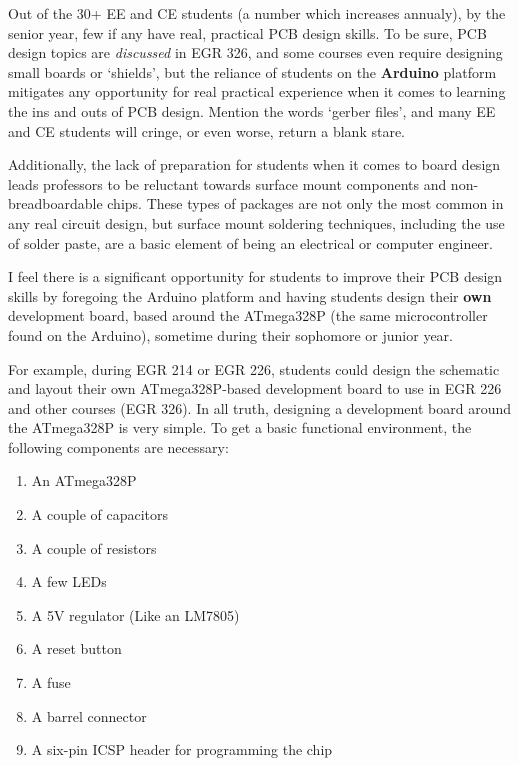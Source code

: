 \documentclass[12pt]{article}
\numberwithin{figure}{section}
\numberwithin{equation}{section}
\begin{document}
{\bigskip

Out of the 30+ EE and CE students (a number which increases annualy), by
the senior year, few if any have real, practical PCB design skills. To
be sure, PCB design topics are \emph{discussed} in EGR 326, and some
courses even require designing small boards or `shields', but the
reliance of students on the \textbf{Arduino} platform mitigates any
opportunity for real practical experience when it comes to learning the
ins and outs of PCB design. Mention the words `gerber files', and many
EE and CE students will cringe, or even worse, return a blank stare.

\bigskip

Additionally, the lack of preparation for students when it comes to
board design leads professors to be reluctant towards surface mount
components and non-breadboardable chips. These types of packages are not
only the most common in any real circuit design, but surface mount
soldering techniques, including the use of solder paste, are a basic
element of being an electrical or computer engineer.

\bigskip

I feel there is a significant opportunity for students to improve their
PCB design skills by foregoing the Arduino platform and having students
design their \textbf{own} development board, based around the ATmega328P
(the same microcontroller found on the Arduino), sometime during their
sophomore or junior year.

\bigskip

For example, during EGR 214 or EGR 226, students could design the
schematic and layout their own ATmega328P-based development board to use
in EGR 226 and other courses (EGR 326). In all truth, designing a
development board around the ATmega328P is very simple. To get a basic
functional environment, the following components are necessary:

\begin{enumerate}
\itemsep1pt\parskip0pt
\item An ATmega328P
\item A couple of capacitors
\item A couple of resistors
\item A few LEDs
\item A 5V regulator (Like an LM7805)
\item A reset button
\item A fuse
\item A barrel connector
\item A six-pin ICSP header for programming the chip
\end{enumerate}

}
\end{document}
